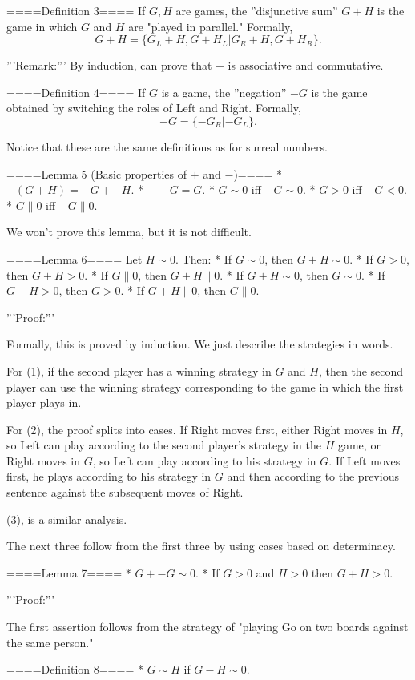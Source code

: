 ====Definition 3====
If $G,H$ are games, the ''disjunctive sum'' $G+H$ is the game in which $G$ and $H$ are "played in parallel." Formally,
$$G+H=\{G_L+H,G+H_L|G_R+H, G+H_R\}.$$

'''Remark:'''
By induction, can prove that $+$ is associative and commutative. 

====Definition 4====
If $G$ is a game, the ''negation'' $-G$ is the game obtained by switching the roles of Left and Right. Formally,
$$-G=\{-G_R|-G_L\}.$$

Notice that these are the same definitions as for surreal numbers.

====Lemma 5 (Basic properties of $+$ and $-$)====
* $-(G+H)=-G+-H$.
* $--G=G$.
* $G\sim 0$ iff $-G\sim 0$.
* $G>0$ iff $-G<0$.
* $G\parallel 0$ iff $-G\parallel 0$.

We won't prove this lemma, but it is not difficult.

====Lemma 6====
Let $H\sim 0$. Then:
* If $G\sim 0$, then $G+H\sim 0$.
* If $G>0$, then $G+H>0$.
* If $G\parallel 0$, then $G+H\parallel 0$.
* If $G+H\sim 0$, then $G\sim 0$.
* If $G+H>0$, then $G>0$.
* If $G+H\parallel 0$, then $G\parallel 0$.

'''Proof:'''

Formally, this is proved by induction. We just describe the strategies in words.

For (1), if the second player has a winning strategy in $G$ and $H$, then the second player can use the winning strategy corresponding to the game in which the first player plays in.

For (2), the proof splits into cases. If Right moves first, either Right moves in $H$, so Left can play according to the second player's strategy in the $H$ game, or Right moves in $G$, so Left can play according to his strategy in $G$. If Left moves first, he plays according to his strategy in $G$ and then according to the previous sentence against the subsequent moves of Right.

(3), is a similar analysis.

The next three follow from the first three by using cases based on determinacy.

====Lemma 7====
* $G+ -G\sim 0$.
* If $G>0$ and $H>0$ then $G+H>0$.

'''Proof:'''

The first assertion follows from the strategy of "playing Go on two boards against the same person."


====Definition 8====
* $G\sim H$ if $G-H\sim 0$.
